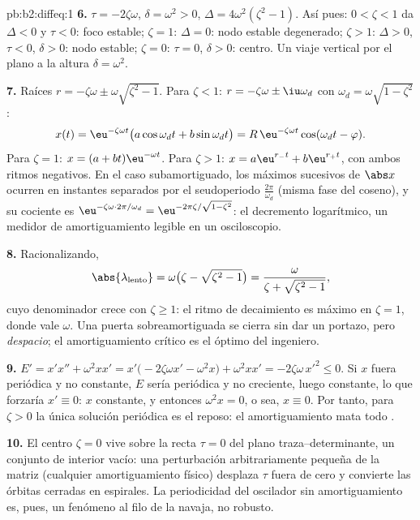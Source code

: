 \begin{solution}{pb:b2:diffeq:1}
\textbf{6.} $\tau = -2\zeta\omega$, $\delta = \omega^2 > 0$, $\Delta
= 4\omega^2(\zeta^2 - 1)$. Así pues: $0 < \zeta < 1$ da $\Delta < 0$
y $\tau < 0$: foco estable; $\zeta = 1$: $\Delta = 0$: nodo estable
degenerado; $\zeta > 1$: $\Delta > 0$, $\tau < 0$, $\delta > 0$: nodo
estable; $\zeta = 0$: $\tau = 0$, $\delta > 0$: centro. Un viaje
vertical por el plano a la altura $\delta = \omega^2$.

\textbf{7.} Raíces $r = -\zeta\omega \pm \omega\sqrt{\zeta^2-1}$.
Para $\zeta < 1$: $r = -\zeta\omega \pm \iu\omega_d$ con $\omega_d =
\omega\sqrt{1-\zeta^2}$:
\[
x(t) = \eu^{-\zeta\omega t}\bigl(a\cos\omega_dt +
b\sin\omega_dt\bigr)
= R\,\eu^{-\zeta\omega t}\cos(\omega_dt - \varphi) .
\]
Para $\zeta = 1$: $x = (a + bt)\eu^{-\omega t}$. Para $\zeta > 1$: $x
= a\eu^{r_-t} + b\eu^{r_+t}$, con ambos ritmos negativos. En el caso
subamortiguado, los máximos sucesivos de $\abs x$ ocurren en
instantes separados por el seudoperiodo $\frac{2\pi}{\omega_d}$
(misma fase del coseno), y su cociente es
$\eu^{-\zeta\omega\cdot2\pi/\omega_d} =
\eu^{-2\pi\zeta/\sqrt{1-\zeta^2}}$: el decremento logarítmico, un
medidor de amortiguamiento legible en un osciloscopio.

\textbf{8.} Racionalizando,
\[
\abs{\lambda_{\mathrm{lento}}} = \omega\bigl(\zeta -
\sqrt{\zeta^2-1}\bigr)
= \frac{\omega}{\zeta + \sqrt{\zeta^2 - 1}} ,
\]
cuyo denominador crece con $\zeta \geq 1$: el ritmo de decaimiento es
máximo en $\zeta = 1$, donde vale $\omega$. Una puerta
sobreamortiguada se cierra sin dar un portazo, pero \emph{despacio};
el amortiguamiento crítico es el óptimo del ingeniero.

\textbf{9.} $E' = x'x'' + \omega^2xx' = x'\bigl(-2\zeta\omega x' -
\omega^2x\bigr) + \omega^2xx' = -2\zeta\omega\,x'^2 \leq 0$. Si $x$
fuera periódica y no constante, $E$ sería periódica y no creciente,
luego constante, lo que forzaría $x' \equiv 0$: $x$ constante, y
entonces $\omega^2x = 0$, o sea, $x \equiv 0$. Por tanto, para $\zeta
> 0$ la única solución periódica es el reposo: el amortiguamiento
mata todo .

\textbf{10.} El centro $\zeta = 0$ vive sobre la recta $\tau = 0$ del
plano traza--determinante, un conjunto de interior vacío: una
perturbación arbitrariamente pequeña de la matriz (cualquier
amortiguamiento físico) desplaza $\tau$ fuera de cero y convierte las
órbitas cerradas en espirales. La periodicidad del oscilador sin
amortiguamiento es, pues, un fenómeno al filo de la navaja, no
robusto.


\end{solution}

